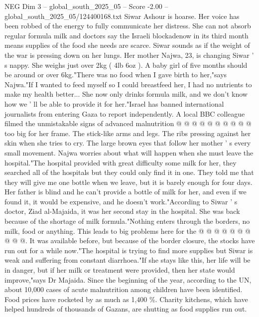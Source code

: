 \begin{textsample}{NEG Dim 3 – global\_south\_2025\_05 – Score -2.00 – global\_south\_2025\_05/124400168.txt}  \label{ex:f3_neg_171}
Siwar Ashour is hoarse.
Her voice has been robbed of the energy to fully communicate her distress.
She can not absorb regular formula milk and doctors say the Israeli blockadenow in its third month means supplies of the food she needs are scarce.
Siwar sounds as if the weight of the war is pressing down on her lungs.
Her mother Najwa, 23, is changing Siwar ' s nappy.
She weighs just over 2kg ( 4lb 6oz ).
A baby girl of five months should be around or over 6kg."There was no food when I gave birth to her,"says Najwa."If I wanted to feed myself so I could breastfeed her, I had no nutrients to make my health better...
She now only drinks formula milk, and we don't know how we ' ll be able to provide it for her."Israel has banned international journalists from entering Gaza to report independently.
A local BBC colleague filmed the unmistakable signs of advanced malnutrition @ @ @ @ @ @ @ @ @ @ too big for her frame.
The stick-like arms and legs.
The ribs pressing against her skin when she tries to cry.
The large brown eyes that follow her mother ' s every small movement.
Najwa worries about what will happen when she must leave the hospital."The hospital provided with great difficulty some milk for her, they searched all of the hospitals but they could only find it in one.
They told me that they will give me one bottle when we leave, but it is barely enough for four days.
Her father is blind and he can't provide a bottle of milk for her, and even if we found it, it would be expensive, and he doesn't work."According to Siwar ' s doctor, Ziad al-Majaida, it was her second stay in the hospital.
She was back because of the shortage of milk formula."Nothing enters through the borders, no milk, food or anything.
This leads to big problems here for the @ @ @ @ @ @ @ @ @ @.
It was available before, but because of the border closure, the stocks have run out for a while now."The hospital is trying to find more supplies but Siwar is weak and suffering from constant diarrhoea."If she stays like this, her life will be in danger, but if her milk or treatment were provided, then her state would improve,"says Dr Majaida.
Since the beginning of the year, according to the UN, about 10,000 cases of acute malnutrition among children have been identified.
Food prices have rocketed by as much as 1,400 \%.
Charity kitchens, which have helped hundreds of thousands of Gazans, are shutting as food supplies run out.

\end{textsample}
